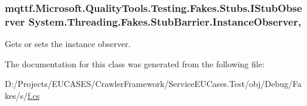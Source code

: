 \hypertarget{class_system_1_1_threading_1_1_fakes_1_1_stub_barrier_a997961cd6099958e369a04c989da12a4}{
\subsubsection[{Instance\-Observer}]{\setlength{\rightskip}{0pt plus 5cm}mqttf.\-Microsoft.\-Quality\-Tools.\-Testing.\-Fakes.\-Stubs.\-I\-Stub\-Observer System.\-Threading.\-Fakes.\-Stub\-Barrier.\-Instance\-Observer\hspace{0.3cm}{\ttfamily [get]}, {\ttfamily [set]}}}\label{class_system_1_1_threading_1_1_fakes_1_1_stub_barrier_a997961cd6099958e369a04c989da12a4}


Gets or sets the instance observer.



The documentation for this class was generated from the following file\-:\begin{DoxyCompactItemize}
\item 
D\-:/\-Projects/\-E\-U\-C\-A\-S\-E\-S/\-Crawler\-Framework/\-Service\-E\-U\-Cases.\-Test/obj/\-Debug/\-Fakes/s/\hyperlink{s_2f_8cs}{f.\-cs}\end{DoxyCompactItemize}
